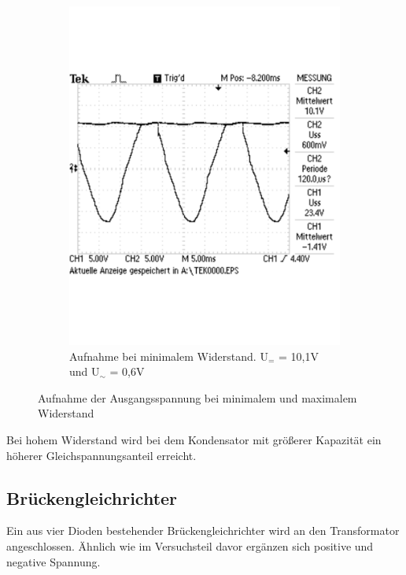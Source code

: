 \documentclass[12pt,a4paper]{article}
\begin{document}
\begin{figure}[H]
\begin{subfigure}[b]{0.48\textwidth}
                \includegraphics[width=\textwidth , scale = 0.4]{2_5_1000F_2.pdf}
                \caption[Aufnahme bei minimalem Widerstand. U$_{=}$ = 10,1V und U$_\sim$ = 0,6V]{Aufnahme bei minimalem Widerstand. U$_{=}$ = 10,1V und U$_\sim$ = 0,6V}
  				\label{fig:2_5_1000F_2}
        \end{subfigure}
        \caption{Aufnahme der Ausgangsspannung bei minimalem und maximalem Widerstand}
        \label{fig:2_5_1000F}
\end{figure}

Bei hohem Widerstand wird bei dem Kondensator mit größerer Kapazität ein höherer Gleichspannungsanteil erreicht.

\subsection{Brückengleichrichter}
Ein aus vier Dioden bestehender Brückengleichrichter wird an den Transformator angeschlossen. Ähnlich wie im Versuchsteil davor ergänzen sich positive und negative Spannung.
\end{document}
